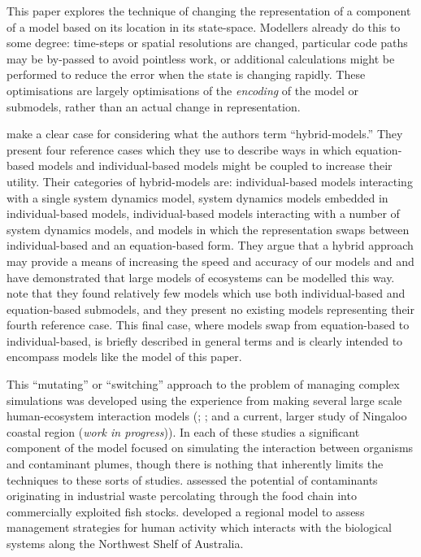 This paper explores the technique of changing the representation of a
component of a model based on its location in its state-space. Modellers
already do this to some degree: time-steps or spatial resolutions are changed,
particular code paths may be by-passed to avoid pointless work, or additional
calculations might be performed to reduce the error when the state is changing
rapidly. These optimisations are largely optimisations of the
{\em{encoding}}\/ of the model or submodels, rather than an actual change in
representation.

 make a clear case for considering what the authors term
``hybrid-models.'' They present four reference cases which they use to
describe ways in which equation-based models and individual-based models might
be coupled to increase their utility. Their categories of hybrid-models are:
individual-based models interacting with a single system dynamics model,
system dynamics models embedded in individual-based models, individual-based
models interacting with a number of system dynamics models, and models in
which the representation swaps between individual-based and an equation-based
form. They argue that a hybrid approach may provide a means of increasing the
speed and accuracy of our models and \citet{Lyne94:1} and \citet{Gray06:1} have
demonstrated that large models of ecosystems can be modelled this way.
\citeauthor{Vincenot11:1} note that they found relatively few models which use both
individual-based and equation-based submodels, and they present no existing
models representing their fourth reference case. This final case, where models
swap from equation-based to individual-based, is briefly described in general
terms and is clearly intended to encompass models like the model of this
paper.

This ``mutating'' or ``switching'' approach to the problem of managing
complex simulations was developed using the experience from making several
large scale human-ecosystem interaction models (\citeauthor{Lyne94:1};
\citeauthor{Gray06:1}; and a current, larger study of Ningaloo coastal region
({\em{work in progress}\/})). In each of these studies a significant component
of the model focused on simulating the interaction between organisms and
contaminant plumes, though there is nothing that inherently limits the
techniques to these sorts of studies.  assessed the
potential of contaminants originating in industrial waste percolating through
the food chain into commercially exploited fish stocks. \citeauthor{Gray06:1}
developed a regional model to assess management strategies for human activity
which interacts with the biological systems along the Northwest Shelf of
Australia.

